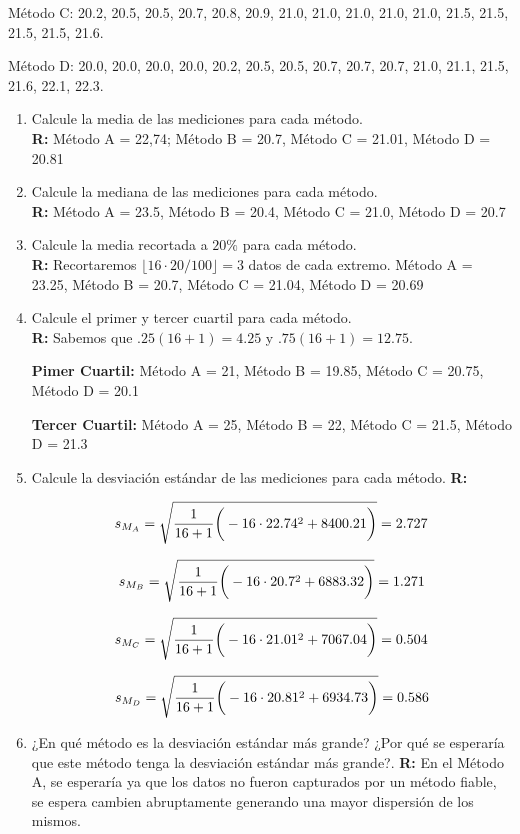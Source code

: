\documentclass[10pt,a4paper]{book}
\begin{document}
\begin{enumerate}
	Método C: 20.2, 20.5, 20.5, 20.7, 20.8, 20.9, 21.0, 21.0, 21.0, 21.0, 21.0, 21.5, 21.5, 21.5, 21.5, 21.6.
	
	Método D: 20.0, 20.0, 20.0, 20.0, 20.2, 20.5, 20.5, 20.7, 20.7, 20.7, 21.0, 21.1, 21.5, 21.6, 22.1, 22.3.
	
	\begin{enumerate}
		\item Calcule la media de las mediciones para cada método.\\
		\textbf{R:} Método A = 22,74; Método B = 20.7, Método C = 21.01, Método D = 20.81
		
		\item Calcule la mediana de las mediciones para cada método.\\
		\textbf{R:} Método A = 23.5, Método B = 20.4, Método C = 21.0, Método D = 20.7
		
		\item Calcule la media recortada a $ 20\% $ para cada método.\\
		\textbf{R:} Recortaremos $ \lfloor 16\cdot20/100 \rfloor = 3$ datos de cada extremo. Método A = 23.25, Método B = 20.7, Método C = 21.04, Método D = 20.69
		
		\item Calcule el primer y tercer cuartil para cada método.\\
		\textbf{R:} Sabemos que $ .25(16+1) = 4.25 $ y $ .75(16+1) = 12.75 $.
		
		\textbf{Pimer Cuartil:} Método A = 21, Método B = 19.85, Método C = 20.75, Método D = 20.1
		
		\textbf{Tercer Cuartil:} Método A = 25, Método B = 22, Método C = 21.5, Método D = 21.3
		
		\item Calcule la desviación estándar de las mediciones para cada método.
		\textbf{R:}
		
		$$ s_{M_A} = \sqrt{\frac{1}{16+1}\bigg{(}-16\cdot22.74^2 + 8400.21\bigg{)}} = 2.727 $$
		
		$$ s_{M_B} = \sqrt{\frac{1}{16+1}\bigg{(}-16\cdot20.7^2 + 6883.32\bigg{)}} = 1.271 $$
		
		$$ s_{M_C} = \sqrt{\frac{1}{16+1}\bigg{(}-16\cdot21.01^2 + 7067.04\bigg{)}} = 0.504 $$
		
		$$ s_{M_D} = \sqrt{\frac{1}{16+1}\bigg{(}-16\cdot 20.81^2 + 6934.73\bigg{)}} = 0.586 $$
		
		\item ¿En qué método es la desviación estándar más grande? ¿Por qué se esperaría que este método tenga la desviación estándar más grande?.
		\textbf{R:} En el Método A, se esperaría ya que los datos no fueron capturados por un método fiable, se espera cambien abruptamente generando una mayor dispersión de los mismos.
		

\end{enumerate}
\end{enumerate}
\end{document}
